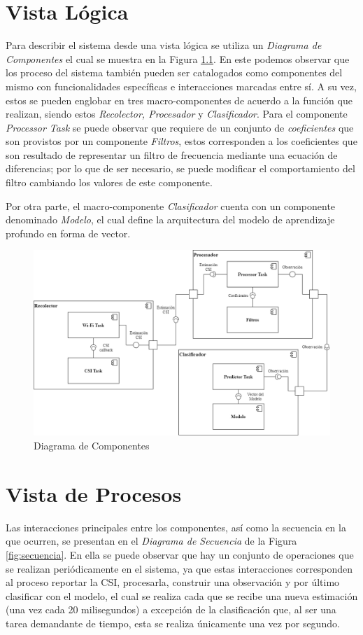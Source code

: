 \documentclass{scrreprt}
\begin{document}
\chapter{Vista Lógica}
Para describir el sistema desde una vista lógica se utiliza un \emph{Diagrama de Componentes} el cual se muestra en la Figura \ref{fig:componentes}. En este podemos observar que los proceso del sistema también pueden ser catalogados como componentes del mismo con funcionalidades específicas e interacciones marcadas entre sí. A su vez, estos se pueden englobar en tres macro-componentes de acuerdo a la función que realizan, siendo estos \emph{Recolector, Procesador} y \emph{Clasificador}. Para el componente \emph{Processor Task} se puede observar que requiere de un conjunto de \emph{coeficientes} que son provistos por un componente \emph{Filtros}, estos corresponden a los coeficientes que son resultado de representar un filtro de frecuencia mediante una ecuación de diferencias; por lo que de ser necesario, se puede modificar el comportamiento del filtro cambiando los valores de este componente.

Por otra parte, el macro-componente \emph{Clasificador} cuenta con un componente denominado \emph{Modelo}, el cual define la arquitectura del modelo de aprendizaje profundo en forma de vector. 

\begin{figure}[h!]
    \centering
    \includegraphics[scale = 0.39]{images/component.png}
    \caption{Diagrama de Componentes}
    \label{fig:componentes}
\end{figure}

\chapter{Vista de Procesos}
Las interacciones principales entre los componentes, así como la secuencia en la que ocurren, se presentan en el \emph{Diagrama de Secuencia} de la Figura \ref{fig:secuencia}. En ella se puede observar que hay un conjunto de operaciones que se realizan periódicamente en el sistema, ya que estas interacciones corresponden al proceso reportar la CSI, procesarla, construir una observación y por último clasificar con el modelo, el cual se realiza cada que se recibe una nueva estimación (una vez cada 20 milisegundos) a excepción de la clasificación que, al ser una tarea demandante de tiempo, esta se realiza únicamente una vez por segundo. 
\end{document}
